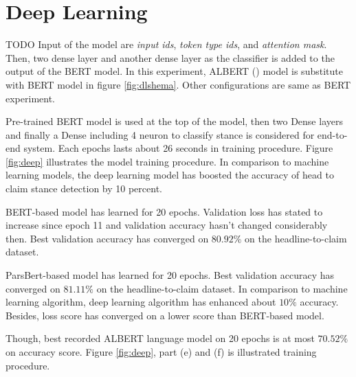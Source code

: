 \section{Deep Learning}
{\color{green} TODO}
Input of the model are \textit{input ids}, \textit{token type ids}, and \textit{attention mask}. Then, two dense layer and another dense layer as the classifier is added to the output of the BERT model. 
In this experiment, ALBERT (\cite{albert})	 model is substitute with BERT model in figure \ref{fig:dlshema}.  Other configurations are same as BERT experiment.


\label{sec:dl}
Pre-trained BERT model is used at the top of the model, then two Dense layers and finally a Dense including 4 neuron to classify stance is considered for end-to-end system. Each epochs lasts about 26 seconds in training procedure. Figure \ref{fig:deep} illustrates the model training procedure. In comparison to machine learning models, the deep learning model has boosted the accuracy of head to claim stance detection by 10 percent. 

BERT-based model has learned for 20 epochs. Validation loss has stated to increase since epoch 11 and validation accuracy hasn't changed considerably then. Best validation accuracy has converged on $80.92\%$ on the headline-to-claim dataset. 

ParsBert-based model has learned for 20 epochs. Best validation accuracy has converged on $81.11\%$ on the headline-to-claim dataset. In comparison to machine learning algorithm, deep learning algorithm has enhanced about $10\%$ accuracy. Besides, loss score has converged on a lower score than BERT-based model.

Though, best recorded ALBERT language model on 20 epochs is at most $70.52\%$ on accuracy score. Figure \ref{fig:deep}, part (e) and (f) is illustrated training procedure.

